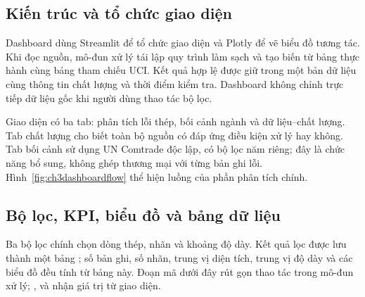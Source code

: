 \subsection{Kiến trúc và tổ chức giao diện}

Dashboard dùng Streamlit để tổ chức giao diện và Plotly để vẽ biểu đồ tương tác. Khi đọc nguồn, mô-đun xử lý tái lập quy trình làm sạch và tạo biến từ bảng thực hành cùng bảng tham chiếu UCI. Kết quả hợp lệ được giữ trong một bản dữ liệu cùng thông tin chất lượng và thời điểm kiểm tra. Dashboard không chỉnh trực tiếp dữ liệu gốc khi người dùng thao tác bộ lọc.

\begin{center}\begin{minipage}{\linewidth}
  \centering
  \begingroup
  \small
  \setlength{\fboxsep}{6pt}
  \endgroup
  \label{fig:ch3dashboardflow}
\end{minipage}\end{center}

Giao diện có ba tab: phân tích lỗi thép, bối cảnh ngành và dữ liệu--chất lượng. Tab chất lượng cho biết toàn bộ nguồn có đáp ứng điều kiện xử lý hay không. Tab bối cảnh sử dụng UN Comtrade độc lập, có bộ lọc năm riêng; đây là chức năng bổ sung, không ghép thương mại với từng bản ghi lỗi. Hình~\ref{fig:ch3dashboardflow} thể hiện luồng của phần phân tích chính.

\subsection{Bộ lọc, KPI, biểu đồ và bảng dữ liệu}

Ba bộ lọc chính chọn dòng thép, nhãn và khoảng độ dày. Kết quả lọc được lưu thành một bảng ; số bản ghi, số nhãn, trung vị diện tích, trung vị độ dày và các biểu đồ đều tính từ bảng này. Đoạn mã dưới đây rút gọn thao tác trong mô-đun xử lý; ,  và  nhận giá trị từ giao diện.

